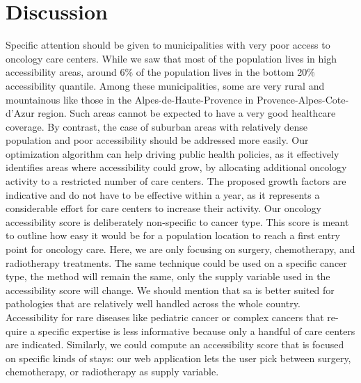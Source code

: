 \section{Discussion}

Specific attention should be given to municipalities with very poor access to oncology care centers. While we saw that most of the population lives in high accessibility areas, around 6\% of the population lives in the bottom 20\% accessibility quantile. Among these municipalities, some are very rural and mountainous like those in the Alpes-de-Haute-Provence in Provence-Alpes-Cote-d'Azur region. Such areas cannot be expected to have a very good healthcare coverage. By contrast, the case of suburban areas with relatively dense population and poor accessibility should be addressed more easily. Our optimization algorithm can help driving public health policies, as it effectively identifies areas where accessibility could grow, by allocating additional oncology activity to a restricted number of care centers. The proposed growth factors are indicative and do not have to be effective within a year, as it represents a considerable effort for care centers to increase their activity.
Our oncology accessibility score is deliberately non-specific to cancer type. This score is meant to outline how easy it would be for a population location to reach a first entry point for oncology care. Here, we are only focusing on surgery, chemotherapy, and radiotherapy treatments. The same technique could be used on a specific cancer type, the method will remain the same, only the supply variable used in the accessibility score will change. We should mention that \ac{sa} is better suited for pathologies that are relatively well handled across the whole country. Accessibility for rare diseases like pediatric cancer or complex cancers that re-quire a specific expertise is less informative because only a handful of care centers are indicated.
Similarly, we could compute an accessibility score that is focused on specific kinds of stays: our web application lets the user pick between surgery, chemotherapy, or radiotherapy as supply variable.

